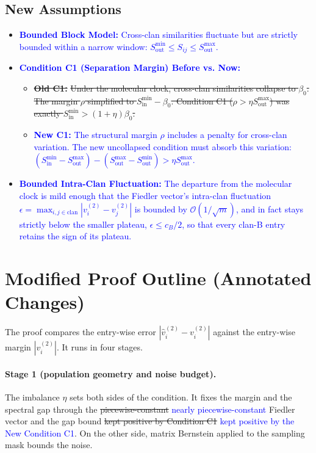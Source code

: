 \documentclass{article}
\begin{document}
\subsection*{New Assumptions}
\begin{itemize}
    \item \textcolor{blue}{\textbf{Bounded Block Model:} Cross-clan similarities fluctuate but are strictly bounded within a narrow window: $S_{\text{out}}^{\min} \le S_{ij} \le S_{\text{out}}^{\max}$.}
    \item \textcolor{blue}{\textbf{Condition C1 (Separation Margin) Before vs. Now:}}
    \begin{itemize}
        \item \sout{\textbf{Old C1:}} \sout{Under the molecular clock, cross-clan similarities collapse to $\beta_0$. The margin $\rho$ simplified to $S_{\text{in}}^{\min} - \beta_0$. Condition C1 ($\rho > \eta S_{\text{out}}^{\max}$) was exactly $S_{\text{in}}^{\min} > (1+\eta)\beta_0$.}
        \item \textcolor{blue}{\textbf{New C1:}} \textcolor{blue}{The structural margin $\rho$ includes a penalty for cross-clan variation. The new uncollapsed condition must absorb this variation: $(S_{\text{in}}^{\min} - S_{\text{out}}^{\max}) - (S_{\text{out}}^{\max} - S_{\text{out}}^{\min}) > \eta S_{\text{out}}^{\max}$.}
    \end{itemize}
    \item \textcolor{blue}{\textbf{Bounded Intra-Clan Fluctuation:} The departure from the molecular clock is mild enough that the Fiedler vector's intra-clan fluctuation $\epsilon = \max_{i,j \in \text{clan}} |v_i^{(2)} - v_j^{(2)}|$ is bounded by $\mathcal{O}(1/\sqrt{m})$, and in fact stays strictly below the smaller plateau, $\epsilon \le c_B/2$, so that every clan-B entry retains the sign of its plateau.}
\end{itemize}

\section{Modified Proof Outline (Annotated Changes)}

The proof compares the entry-wise error $|\hat{v}_i^{(2)} - v_i^{(2)}|$ against the entry-wise margin $|v_i^{(2)}|$. It runs in four stages.

\paragraph{Stage 1 (population geometry and noise budget).} 
The imbalance $\eta$ sets both sides of the condition. It fixes the margin and the spectral gap through the \sout{piecewise-constant} \textcolor{blue}{nearly piecewise-constant} Fiedler vector and the gap bound \sout{kept positive by Condition C1} \textcolor{blue}{kept positive by the New Condition C1}. On the other side, matrix Bernstein applied to the sampling mask bounds the noise.
\end{document}

